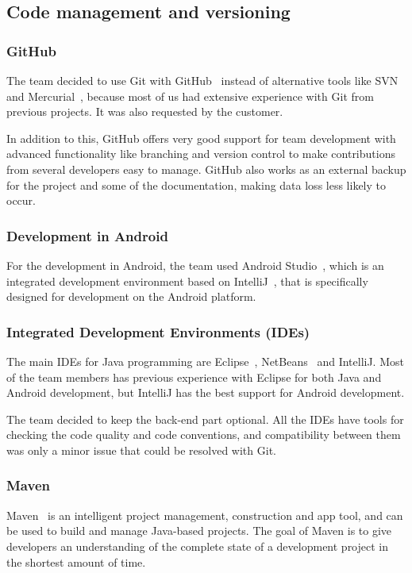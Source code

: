 \subsection{Code management and versioning}
\subsubsection{GitHub}
The team decided to use Git with GitHub~\cite{github} instead of alternative tools like SVN~\cite{svn} and Mercurial~\cite{mercurial}, because most of us had extensive experience with Git from previous projects. It was also requested by the customer. 

In addition to this, GitHub offers very good support for team development with advanced functionality like branching and version control to make contributions from several developers easy to manage. GitHub also works as an external backup for the project and some of the documentation, making data loss less likely to occur.

\subsubsection{Development in Android}
For the development in Android, the team used Android Studio~\cite{android-studio}, which is an integrated development environment based on IntelliJ~\cite{intellij}, that is specifically designed for development on the Android platform.

\subsubsection{Integrated Development Environments (IDEs)}
The main IDEs for Java programming are Eclipse~\cite{eclipse}, NetBeans~\cite{netbeans} and IntelliJ. Most of the team members has previous experience with Eclipse for both Java and Android development, but IntelliJ has the best support for Android development.

The team decided to keep the back-end part optional. All the IDEs have tools for checking the code quality and code conventions, and compatibility between them was only a minor issue that could be resolved with Git.

\subsubsection{Maven}
Maven~\cite{maven} is an intelligent project management, construction and app tool, and can be used to build and manage Java-based projects. The goal of Maven is to give developers an understanding of the complete state of a development project in the shortest amount of time.

